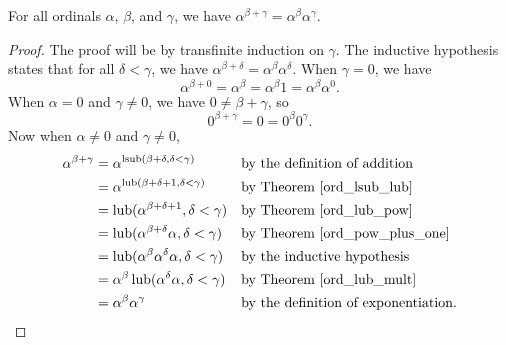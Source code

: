 \documentclass[../../math.tex]{subfiles}
\begin{document}
\begin{theorem} \label{ord_pow_plus}
    For all ordinals $\alpha$, $\beta$, and $\gamma$, we have $\alpha^{\beta +
    \gamma} = \alpha ^ \beta \alpha ^ \gamma$.
\end{theorem}
\begin{proof}
    The proof will be by transfinite induction on $\gamma$.  The inductive
    hypothesis states that for all $\delta < \gamma$, we have $\alpha^{\beta +
    \delta} = \alpha ^ \beta \alpha ^ \delta$.  When $\gamma = 0$, we have
    \[
        \alpha^{\beta + 0} = \alpha^\beta = \alpha^\beta 1 = \alpha^\beta
        \alpha^0.
    \]
    When $\alpha = 0$ and $\gamma \neq 0$, we have $0 \neq \beta + \gamma$, so
    \[
        0^{\beta + \gamma} = 0 = 0^\beta 0^\gamma.
    \]
    Now when $\alpha \neq 0$ and $\gamma \neq 0$,
    \begin{align*}
        \alpha^{\beta + \gamma}
        &= \alpha^{\operatorname{lsub}(\beta + \delta, \delta < \gamma)}
            && \text{by the definition of addition} \\
        &= \alpha^{\operatorname{lub}(\beta + \delta + 1, \delta < \gamma)}
            && \text{by Theorem \ref{ord_lsub_lub}} \\
        &= \operatorname{lub}(\alpha^{\beta + \delta + 1}, \delta < \gamma)
            && \text{by Theorem \ref{ord_lub_pow}} \\
        &= \operatorname{lub}(\alpha^{\beta + \delta} \alpha, \delta < \gamma)
            && \text{by Theorem \ref{ord_pow_plus_one}} \\
        &= \operatorname{lub}(\alpha^\beta \alpha^\delta \alpha, \delta < \gamma)
            && \text{by the inductive hypothesis} \\
        &= \alpha^\beta \operatorname{lub}(\alpha^\delta \alpha, \delta < \gamma)
            && \text{by Theorem \ref{ord_lub_mult}} \\
        &= \alpha^\beta \alpha^\gamma
            && \text{by the definition of exponentiation.}
    \end{align*}
\end{proof}
\end{document}
